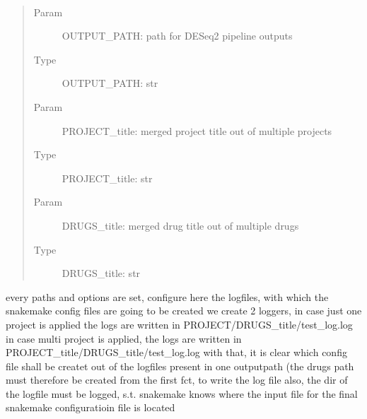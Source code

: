 \documentclass[letterpaper,10pt,english]{sphinxmanual}
\begin{document}
\begin{fulllineitems}
\label{\detokenize{index:create_matrix_new.set_logger}}~\begin{quote}\begin{description}
\item[{Param}] \leavevmode
\sphinxAtStartPar
OUTPUT\_PATH: path for DESeq2 pipeline outputs

\item[{Type}] \leavevmode
\sphinxAtStartPar
OUTPUT\_PATH: str

\item[{Param}] \leavevmode
\sphinxAtStartPar
PROJECT\_title: merged project title out of multiple projects

\item[{Type}] \leavevmode
\sphinxAtStartPar
PROJECT\_title: str

\item[{Param}] \leavevmode
\sphinxAtStartPar
DRUGS\_title: merged drug title out of multiple drugs

\item[{Type}] \leavevmode
\sphinxAtStartPar
DRUGS\_title: str

\end{description}\end{quote}

\sphinxAtStartPar
every paths and options are set, configure here the logfiles, with which
the snakemake config files are going to be created we create 2 loggers, in
case just one project is applied the logs are written in
PROJECT/DRUGS\_title/test\_log.log in case multi project is applied, the logs
are written in PROJECT\_title/DRUGS\_title/test\_log.log with that, it is
clear which config file shall be createt out of the logfiles present in one
outputpath (the drugs path must therefore be created from the first fct, to
write the log file also, the dir of the logfile must be logged, s.t.
snakemake knows where the input file for the final snakemake configuratioin
file is located

\end{fulllineitems}

\label{\detokenize{index:module-lifeline_summary_test_2}}
\end{document}
